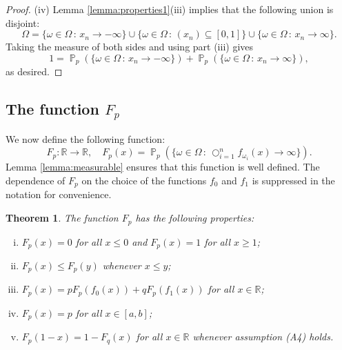 \documentclass[a4paper,12pt]{article}
\newtheorem{theorem}{Theorem}[section]
\DeclareMathOperator{\prob}{\mathbb{P}}
\DeclareMathOperator{\bigcomp}{\bigcirc}
\begin{document}
\begin{proof}
(iv) Lemma \ref{lemma:properties1}(iii) implies that the following union is disjoint:
\[
\Omega =
	\{\omega \in \Omega \,:\, x_n \to -\infty\} \cup
	\{\omega \in \Omega \,:\, (x_n) \subseteq [0,1]\} \cup
	\{\omega \in \Omega \,:\, x_n \to \infty\}.
\]
Taking the measure of both sides and using part (iii) gives
\[
1 = \prob_p(\{\omega \in \Omega \,:\, x_n \to -\infty\}) + \prob_p(\{\omega \in \Omega \,:\, x_n \to \infty\}),
\]
as desired.
\end{proof}


\subsection{The function $F_p$}

We now define the following function:
\[
F_{p} : \mathbb{R} \to \mathbb{R}, \quad
F_{p}(x) = \prob_p(\{ \omega \in \Omega \,:\, \bigcomp_{i=1}^n f_{\omega_i}(x) \to \infty \}).
\]
Lemma \ref{lemma:measurable} ensures that this function is well defined. The dependence of $F_p$ on the choice of the functions $f_0$ and $f_1$ is suppressed in the notation for convenience.

\begin{theorem}
\label{theorem:cantor_properties}
The function $F_{p}$ has the following properties:
\begin{enumerate}[(i)]
\item $F_{p}(x) = 0$ for all $x \leq 0$ and $F_{p}(x) = 1$ for all $x \geq 1$;
\item $F_{p}(x) \leq F_p(y)$ whenever $x \leq y$;
\item $F_p(x) = pF_p(f_0(x)) + qF_p(f_1(x))$ for all $x \in \mathbb{R}$;
\item $F_p(x) = p$ for all $x \in [a,b]$;
\item $F_{p}(1-x) = 1-F_{q}(x)$ for all $x \in \mathbb{R}$ whenever assumption (A4) holds.
\end{enumerate}
\end{theorem}
\end{document}
